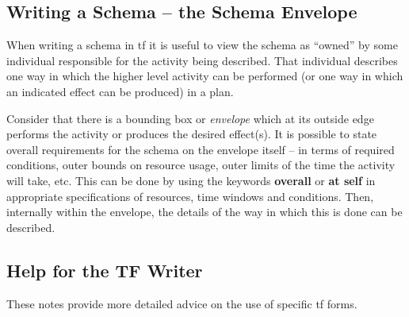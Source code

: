 \subsection{Writing a Schema -- the Schema Envelope}

When writing a schema in {\sc tf} it is useful to view the schema as ``owned''
by some individual responsible for the activity being described.  That
individual describes one way in which the higher level activity can be
performed (or one way in which an indicated effect can be produced) in a plan.

Consider that there is a bounding box or {\em envelope} which at its outside
edge performs the activity or produces the desired effect(s).  It is possible
to state overall requirements for the schema on the envelope itself -- in terms
of required conditions, outer bounds on resource usage, outer limits of the
time the activity will take, etc.  This can be done by using the keywords {\bf
overall} or {\bf at self} in appropriate specifications of resources, time
windows and conditions.  Then, internally within the envelope, the details of
the way in which this is done can be described.

\subsection{Help for the TF Writer}

These notes provide more detailed advice on the use of specific {\sc tf}
forms.

